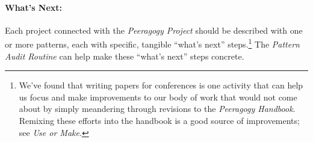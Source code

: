 \paragraph{What's Next:}  Each project connected with the \emph{Peeragogy Project} should be described with one or more patterns, each with specific, tangible ``what's next'' steps.\footnote{We've found that writing papers for conferences is one activity that can help us focus and make improvements to our body of work that would not come about by simply meandering through revisions to the \emph{Peeragogy Handbook}.  Remixing these efforts into the handbook is a good source of improvements; see \emph{Use or Make}.}  The \emph{Pattern Audit Routine} can help make these ``what's next'' steps concrete. 
